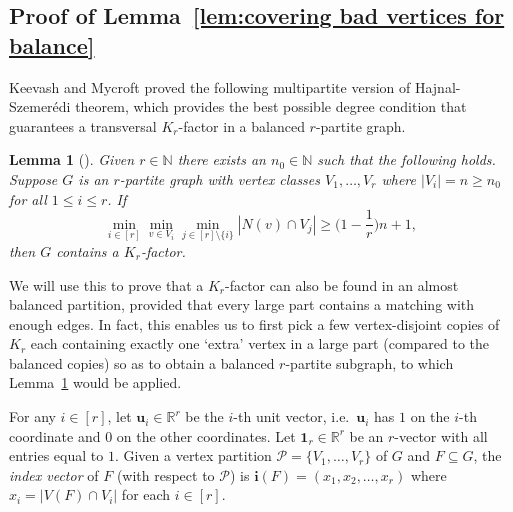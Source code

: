 \documentclass[11pt, a4paper]{article}
\newtheorem{lemma}[theorem]{Lemma}
\theoremstyle{definition}
\newcommand{\<}{\subseteq}
\begin{document}



\subsection{Proof of Lemma~\ref{lem:covering bad vertices for balance}}

Keevash and Mycroft \cite{KM-multi} proved the following multipartite version of Hajnal-Szemer\'edi theorem, which provides the best possible degree condition that guarantees a transversal $K_r$-factor in a balanced $r$-partite graph.%

\begin{lemma}[\cite{KM-multi}]\label{lem:HS thm in multipartite graph} 
Given $r \in \mathbb{N}$ there exists an $n_0 \in \mathbb{N}$ such that the following holds. Suppose $G$ is an $r$-partite graph with vertex classes $V_1, \dots, V_r$ where $|V_i| = n \geq n_0$ for all $1 \leq i \leq r$. If
\[
\min_{i\in [r]}\min_{v\in V_i}\min_{j\in [r]\setminus \{i\}} |N(v)\cap V_j| \geq \Big(1 - \frac{1}{r}\Big)n + 1,
\]
then $G$ contains a $K_r$-factor.
\end{lemma}
We will use this to prove that a $K_r$-factor can also be found in an almost balanced partition,  provided that every large part {contains a matching with enough edges.} In fact, this enables us to first pick a few vertex-disjoint copies of $K_r$ each containing exactly one `extra' vertex in a large part (compared to the balanced copies) so as to obtain a balanced $r$-partite subgraph, to which Lemma~\ref{lem:HS thm in multipartite graph} would be applied. 

For any \( i \in [r] \), let \( \mathbf{u}_i\in \mathbb{R}^r \) be the \( i \)-th unit vector, i.e.\ \( \mathbf{u}_i \) has $1$ on the \( i \)-th coordinate and $0$ on the other coordinates.  Let \( \mathbf{1}_r\in \mathbb{R}^r \) be an $r$-vector {with all entries equal to $1$.}
Given a vertex partition $\mathcal{P}=\{V_1,\ldots,V_r\}$ of $G$ and $F\<G$,  the \textit{index vector} of \( F \)  (with respect to $\mathcal{P}$) is \( \mathbf{i}(F) = (x_1, x_2, \ldots, x_{r}) \) where \( x_i = |V(F) \cap V_i| \) for each \( i \in [r] \). %
\end{document}
